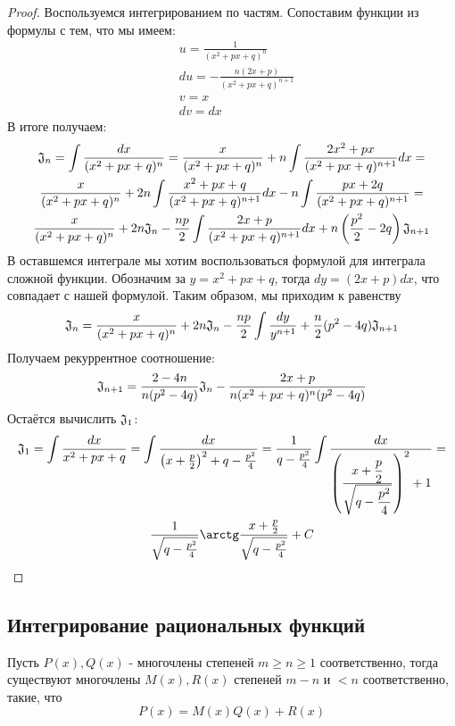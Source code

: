 \begin{proof}
	Воспользуемся интегрированием по частям. Сопоставим функции из формулы с тем, что мы имеем:
	\begin{align*}
		&{u = \frac{1}{(x^2 + px + q)^n}}
		\\
		&{du = -\frac{n(2x + p)}{(x^2 + px + q)^{n + 1}}}
		\\
		&{v = x}
		\\
		&{dv = dx}
	\end{align*}
	В итоге получаем:
	\begin{multline*}
		\mathfrak{J}_n = \int \frac{dx}{(x^2 + px + q)^n} = \frac{x}{(x^2 + px + q)^n} + n\int \frac{2x^2 + px}{(x^2 + px + q)^{n + 1}}dx =
		\\
		\frac{x}{(x^2 + px + q)^n} + 2n\int \frac{x^2 + px + q}{(x^2 + px + q)^{n + 1}}dx - n\int \frac{px + 2q}{(x^2 + px + q)^{n + 1}} =
		\\
		\frac{x}{(x^2 + px + q)^n} + 2n\mathfrak{J}_n - \frac{np}{2}\int \frac{2x + p}{(x^2 + px + q)^{n + 1}}dx + n\left(\frac{p^2}{2} - 2q\right) \mathfrak{J}_{n + 1}
	\end{multline*}
	В оставшемся интеграле мы хотим воспользоваться формулой для интеграла сложной функции. Обозначим за $y = x^2 + px + q$, тогда $dy = (2x + p)dx$, что совпадает с нашей формулой. Таким образом, мы приходим к равенству
	\[
		\mathfrak{J}_n = \frac{x}{(x^2 + px + q)^n} + 2n\mathfrak{J}_n - \frac{np}{2}\int \frac{dy}{y^{n + 1}} + \frac{n}{2}(p^2 - 4q)\mathfrak{J}_{n + 1}
	\]
	Получаем рекуррентное соотношение:
	\[
		\mathfrak{J}_{n + 1} = \frac{2 - 4n}{n(p^2 - 4q)}\mathfrak{J}_n - \frac{2x + p}{n(x^2 + px + q)^n(p^2 - 4q)}
	\]
	Остаётся вычислить $\mathfrak{J}_1$:
	\begin{multline*}
		\goth{J}_1 = \int \frac{dx}{x^2 + px + q} = \int \frac{dx}{\left(x + \frac{p}{2}\right)^2 + q - \frac{p^2}{4}} = \frac{1}{q - \frac{p^2}{4}} \int \frac{dx}{\left(\frac{\dse x + \frac{p}{2}}{\dse \sqrt{q - \frac{p^2}{4}}}\right)^2 + 1} =
		\\
		\frac{1}{\sqrt{q - \frac{p^2}{4}}} \arctg \frac{x + \frac{p}{2}}{\sqrt{q - \frac{p^2}{4}}} + C
	\end{multline*}
\end{proof}

\subsection{Интегрирование рациональных функций}

\begin{lemma}
	Пусть $P(x), Q(x)$ - многочлены степеней $m \ge n \ge 1$ соответственно, тогда существуют многочлены $M(x), R(x)$ степеней $m - n$ и $< n$ соответственно, такие, что
	\[
		P(x) = M(x)Q(x) + R(x)
	\]
\end{lemma}


